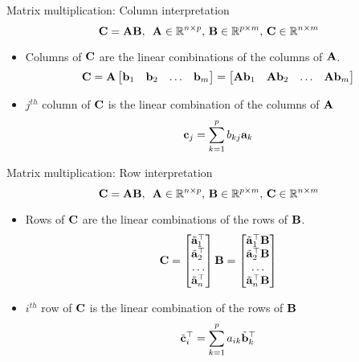 \documentclass[aspectratio=169]{beamer}
\let\olditem\item
\renewcommand{\item}{\setlength{\itemsep}{\fill}\olditem}
\def\mf{\ensuremath\mathbf}
\begin{document}
\begin{frame}[t]{Matrix multiplication: Column interpretation}
\[ \mf{C} = \mf{A}\mf{B}, \,\,\, \mf{A} \in \mathbb{R}^{n \times p}, \, \mf{B} \in \mathbb{R}^{p \times m}, \, \mf{C} \in \mathbb{R}^{n \times m} \]
\begin{itemize}
\item Columns of $\mf{C}$ are the linear combinations of the columns of $\mf{A}$.
\[ \mf{C} = \mf{A} \begin{bmatrix}
\mf{b}_{1} & \mf{b}_{2} & \ldots & \mf{b}_{m}
\end{bmatrix} = \begin{bmatrix}
\mf{A}\mf{b}_{1} & \mf{A}\mf{b}_{2} & \ldots & \mf{A}\mf{b}_{m}
\end{bmatrix} \]

\item $j^{th}$ column of $\mf{C}$ is the linear combination of the columns of $\mf{A}$
\[ \mf{c}_j = \sum_{k=1}^{p} b_{kj} \mf{a}_k \]
\end{itemize}
\end{frame}


\begin{frame}[t]{Matrix multiplication: Row interpretation}
\[ \mf{C} = \mf{A}\mf{B}, \,\,\, \mf{A} \in \mathbb{R}^{n \times p}, \, \mf{B} \in \mathbb{R}^{p \times m}, \, \mf{C} \in \mathbb{R}^{n \times m} \]
\begin{itemize}
\item Rows of $\mf{C}$ are the linear combinations of the rows of $\mf{B}$.
\[ \mf{C} = \begin{bmatrix}
\tilde{\mf{a}}_{1}^\top \\ \tilde{\mf{a}}_{2}^\top \\ \ldots \\ \tilde{\mf{a}}_{n}^\top
\end{bmatrix} \mf{B}  = \begin{bmatrix}
\tilde{\mf{a}}_{1}^\top \mf{B} \\ \tilde{\mf{a}}_{2}^\top \mf{B} \\ \ldots \\ \tilde{\mf{a}}_{n}^\top \mf{B}
\end{bmatrix} \]

\item $i^{th}$ row of $\mf{C}$ is the linear combination of the rows of $\mf{B}$
\[ \tilde{\mf{c}}_i^\top = \sum_{k=1}^{p} a_{ik} \tilde{\mf{b}}_{k}^\top  \]
\end{itemize}
\end{frame}
\end{document}
